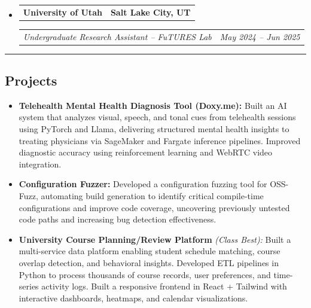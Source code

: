 \documentclass[11pt,letterpaper]{article}
\makeatletter
\newcommand{\headerrow}[2]
{\begin{tabular*}{\linewidth}{l@{\extracolsep{\fill}}r}
#1 &
#2 \\
\end{tabular*}}
\makeatother
\begin{document}
\begin{itemize}[leftmargin=1em]
	\item
	      \headerrow
	      {\textbf{University of Utah}}
	      {\textbf{Salt Lake City, UT}}
	      \headerrow
	      {\emph{Undergraduate Research Assistant -- FuTURES Lab}}
	      {\emph{May 2024 -- Jun 2025}}
\end{itemize}
\hrule
{}

\vspace{-1em}
\subsection*{\Large Projects}
\begin{itemize}[leftmargin=1em,noitemsep]
\item \textbf{Telehealth Mental Health Diagnosis Tool (Doxy.me):} Built an AI system that analyzes visual, speech, and tonal cues from telehealth sessions using PyTorch and Llama, delivering structured mental health insights to treating physicians via SageMaker and Fargate inference pipelines. Improved diagnostic accuracy using reinforcement learning and WebRTC video integration.
\item \textbf{Configuration Fuzzer:} Developed a configuration fuzzing tool for OSS-Fuzz, automating build generation to identify critical compile-time configurations and improve code coverage, uncovering previously untested code paths and increasing bug detection effectiveness.
\item \textbf{University Course Planning/Review Platform} \emph{(Class Best):} Built a multi-service data platform enabling student schedule matching, course overlap detection, and behavioral insights. Developed ETL pipelines in Python to process thousands of course records, user preferences, and time-series activity logs. Built a responsive frontend in React + Tailwind with interactive dashboards, heatmaps, and calendar visualizations.
\end{itemize}
\end{document}
